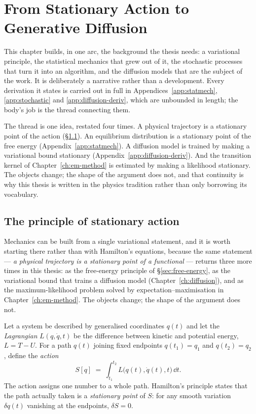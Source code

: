 \chapter{From Stationary Action to Generative Diffusion}
\label{ch:statmech}\label{ch:background}\label{ch:stochproc}\label{ch:diffusion}

This chapter builds, in one arc, the background the thesis needs: a variational
principle, the statistical mechanics that grew out of it, the stochastic
processes that turn it into an algorithm, and the diffusion models that are the
subject of the work. It is deliberately a narrative rather than a development.
Every derivation it states is carried out in full in
Appendices~\ref{app:statmech}, \ref{app:stochastic} and
\ref{app:diffusion-deriv}, which are unbounded in length; the body's job is the
thread connecting them.

The thread is one idea, restated four times. A physical trajectory is a
stationary point of the action (\S\ref{sec:action}). An equilibrium
distribution is a stationary point of the free energy
(Appendix~\ref{app:statmech}). A diffusion model is trained by making a
variational bound stationary (Appendix~\ref{app:diffusion-deriv}). And the
transition kernel of Chapter~\ref{ch:em-method} is estimated by making a
likelihood stationary. The objects change; the shape of the argument does not,
and that continuity is why this thesis is written in the physics tradition
rather than only borrowing its vocabulary.

\section{The principle of stationary action}\label{sec:action}

Mechanics can be built from a single variational statement, and it is worth
starting there rather than with Hamilton's equations, because the same
statement --- \emph{a physical trajectory is a stationary point of a
functional} --- returns three more times in this thesis: as the free-energy
principle of \S\ref{sec:free-energy}, as the variational bound that trains a
diffusion model (Chapter~\ref{ch:diffusion}), and as the maximum-likelihood
problem solved by expectation--maximisation in
Chapter~\ref{ch:em-method}. The objects change; the shape of the argument
does not.

Let a system be described by generalised coordinates $q(t)$ and let the
\emph{Lagrangian} $L(q, \dot q, t)$ be the difference between kinetic and
potential energy, $L = T - U$. For a path $q(t)$ joining fixed endpoints
$q(t_1) = q_1$ and $q(t_2) = q_2$, define the \emph{action}
\begin{equation}
  S[q] \;=\; \int_{t_1}^{t_2} L\big(q(t), \dot q(t), t\big)\,\dd t .
  \label{eq:action}
\end{equation}
The action assigns one number to a whole path. Hamilton's principle states
that the path actually taken is a \emph{stationary point} of $S$: for any
smooth variation $\delta q(t)$ vanishing at the endpoints,
$\delta S = 0$.

